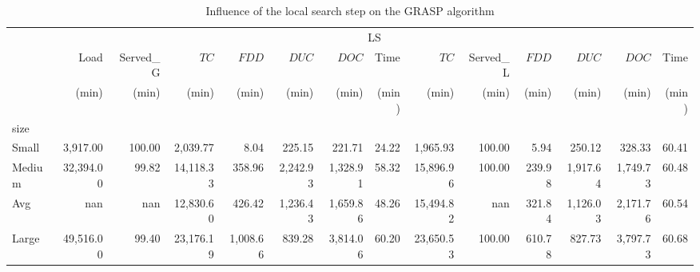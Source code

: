 \begin{table}[htb]
\centering
\caption{Influence of the local search step on the GRASP algorithm}
\label{tab:grasp_ls_nols}
\begin{tabular}{lrrrrrrrrrrrrr}
\toprule
 & \multicolumn{13}{c}{LS} \\
 & Load & Served_G & $TC$ & $FDD$ & $DUC$ & $DOC$ & Time & $TC$ & Served_L & $FDD$ & $DUC$ & $DOC$ & Time \\
 & (min) & (min) & (min) & (min) & (min) & (min) & (min) & (min) & (min) & (min) & (min) & (min) & (min) \\
size &  &  &  &  &  &  &  &  &  &  &  &  &  \\
\midrule
Small & 3,917.00 & 100.00 & 2,039.77 & 8.04 & 225.15 & 221.71 & 24.22 & 1,965.93 & 100.00 & 5.94 & 250.12 & 328.33 & 60.41 \\
Medium & 32,394.00 & 99.82 & 14,118.33 & 358.96 & 2,242.93 & 1,328.91 & 58.32 & 15,896.96 & 100.00 & 239.98 & 1,917.64 & 1,749.73 & 60.48 \\
Avg & nan & nan & 12,830.60 & 426.42 & 1,236.43 & 1,659.86 & 48.26 & 15,494.82 & nan & 321.84 & 1,126.03 & 2,171.76 & 60.54 \\
Large & 49,516.00 & 99.40 & 23,176.19 & 1,008.66 & 839.28 & 3,814.06 & 60.20 & 23,650.53 & 100.00 & 610.78 & 827.73 & 3,797.73 & 60.68 \\
\bottomrule
\end{tabular}
\end{table}
